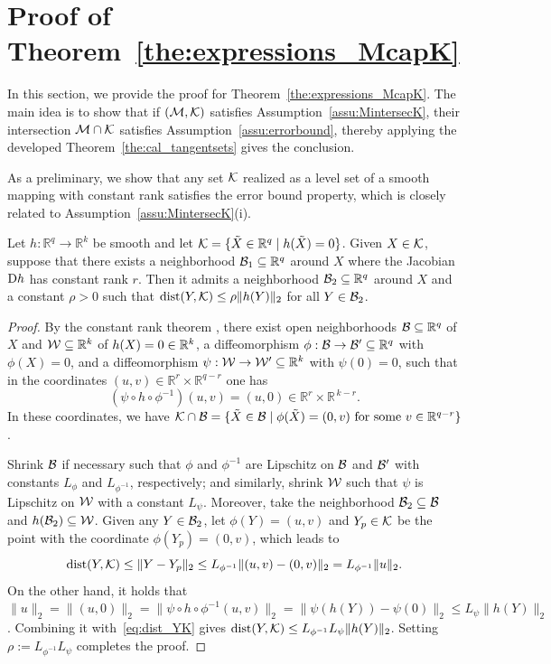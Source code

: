 \section{Proof of Theorem~\ref{the:expressions_McapK}}\label{app:McapK}
In this section, we provide the proof for Theorem~\ref{the:expressions_McapK}. The main idea is to show that if $(\mathcal{M},\mathcal{K})$ satisfies Assumption~\ref{assu:MintersecK}, their intersection $\mathcal{M}\cap\mathcal{K}$ satisfies Assumption~\ref{assu:errorbound}, thereby applying the developed Theorem~\ref{the:cal_tangentsets} gives the conclusion.

As a preliminary, we show that any set $\mathcal{K}$ realized as a level set of a smooth mapping with constant rank satisfies the error bound property, which is closely related to Assumption~\ref{assu:MintersecK}(i).

\begin{lemma}\label{lem:local_error_bound_constant_rank}
Let $h:\mathbb{R}^q\to\mathbb{R}^k$ be smooth and let $\mathcal{K}=\{\tilde X\in\mathbb{R}^q \mid h(\tilde X)=0\}$. Given $X\in\mathcal{K}$, suppose that there exists a neighborhood $\mathcal{B}_1\subseteq\mathbb{R}^q$ around $X$ where the Jacobian $\mathrm{D} h$ has constant rank $r$. Then it admits a neighborhood $\mathcal{B}_2\subseteq\mathbb{R}^q$ around $X$ and a constant $\rho>0$ such that $\operatorname{dist}(Y,\mathcal{K})\le \rho\|h(Y)\|_2$ for all $Y\in\mathcal{B}_2$.
\end{lemma}
\begin{proof}
By the constant rank theorem \cite[Theorem~4.12]{lee2012manifolds}, there exist open neighborhoods $\mathcal{B}\subseteq\mathbb{R}^q$ of $X$ and $\mathcal{W}\subseteq\mathbb{R}^k$ of $h(X)=0\in\mathbb{R}^k$, a diffeomorphism $\phi:\mathcal{B}\to \mathcal{B}'\subseteq\mathbb{R}^q$ with $\phi(X)=0$, and a diffeomorphism $\psi:\mathcal{W}\to \mathcal{W}'\subseteq\mathbb{R}^k$ with $\psi(0)=0$, such that in the coordinates $(u,v)\in\mathbb{R}^r\times\mathbb{R}^{q-r}$ one has
\[
(\psi\circ h\circ \phi^{-1})(u,v)=(u,0)\in\mathbb{R}^r\times\mathbb{R}^{\,k-r}.
\]
In these coordinates, we have $\mathcal{K}\cap \mathcal{B}=\{\tilde{X}\in \mathcal{B}\mid \phi(\tilde{X})=(0,v)\ \text{for some}\ v\in \mathbb{R}^{q-r}\}$.

Shrink $\mathcal{B}$ if necessary such that $\phi$ and $\phi^{-1}$ are Lipschitz on $\mathcal{B}$ and $\mathcal{B}^\prime$ with constants $L_{\phi}$ and $L_{\phi^{-1}}$, respectively; and similarly, shrink $\mathcal{W}$ such that $\psi$ is Lipschitz on $\mathcal{W}$ with a constant $L_{\psi}$. Moreover, take the neighborhood $\mathcal{B}_2\subseteq \mathcal{B}$ and $h(\mathcal{B}_2)\subseteq \mathcal{W}$. Given any $Y\in \mathcal{B}_2$, let $\phi(Y)=(u,v)$ and $Y_p\in\mathcal{K}$ be the point with the coordinate $\phi(Y_p)=(0,v)$, which leads to
\begin{equation}\label{eq:dist_YK}
\operatorname{dist}(Y,\mathcal{K})\le\|Y-Y_p\|_2\le L_{\phi^{-1}}\| (u,v)-(0,v)\|_2=L_{\phi^{-1}}\|u\|_2.
\end{equation}
On the other hand, it holds that $\|u\|_2=\|(u,0)\|_2=\|\psi\circ h\circ \phi^{-1}(u,v)\|_2=\|\psi(h(Y))-\psi(0)\|_2\le L_{\psi}\|h(Y)\|_2$. Combining it with~\eqref{eq:dist_YK} gives $\operatorname{dist}(Y,\mathcal{K})\le L_{\phi^{-1}}L_{\psi}\|h(Y)\|_2$. Setting $\rho:=L_{\phi^{-1}}L_{\psi}$ completes the proof.
\end{proof}

